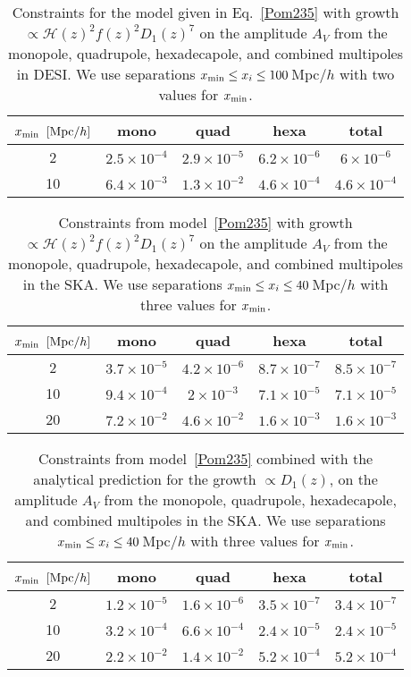 \documentclass[a4paper,twocolumn,aps,prd,nolongbibliography,superscriptaddress,showpacs,showkeys,amsmath,amssymb,floatfix,nofootinbib]{revtex4-1}
\renewcommand{\[}{\begin{equation}}
\renewcommand{\]}{\end{equation}}
\newcommand{\Hcal}{\mathcal{H}}
\begin{document}
\begin{table}[t]
\centering
\begin{tabular}{ | c | c  | c | c | c | }
\hline
$x_{\rm min}$ $[{\rm Mpc}/h]$ & mono & quad & hexa & total \\ \hline
2  & $2.5\times 10^{-4}$ & $2.9\times 10^{-5}$ & $6.2\times 10^{-6}$ & $6\times 10^{-6}$ \\ \hline
10 & $6.4\times 10^{-3}$ & $1.3\times 10^{-2}$ & $4.6\times 10^{-4}$ & $4.6\times 10^{-4}$ \\ \hline
\end{tabular}
\caption{Constraints for the model given in Eq.~\eqref{Pom235} with growth $\propto \Hcal(z)^2f(z)^2D_1(z)^7$ on the amplitude $A_V$ from the monopole, quadrupole, hexadecapole, and combined multipoles in DESI. We use separations $x_{\rm min}\leq x_i\leq 100$\,Mpc$/h$ with two values for $x_{\rm min}$.}
\label{tab:DESI}
\end{table}

\begin{table}[t]
\centering
\begin{tabular}{ | c | c  | c | c | c | }
\hline
$x_{\rm min}$ $[{\rm Mpc}/h]$ & mono & quad & hexa & total \\ \hline
2  & $3.7\times 10^{-5}$ & $4.2\times 10^{-6}$ & $8.7\times 10^{-7}$ & $8.5\times 10^{-7}$ \\ \hline
10 & $9.4\times 10^{-4}$ & $2\times 10^{-3}$ & $7.1\times 10^{-5}$ & $7.1\times 10^{-5}$ \\ \hline
20 & $7.2\times 10^{-2}$ & $4.6\times 10^{-2}$ & $1.6\times 10^{-3}$ & $1.6\times 10^{-3}$ \\ \hline
\end{tabular}
\caption{Constraints from model~\eqref{Pom235} with growth $\propto \Hcal(z)^2f(z)^2D_1(z)^7$ on the amplitude $A_V$ from the monopole, quadrupole, hexadecapole, and combined multipoles in the SKA. We use separations $x_{\rm min}\leq x_i\leq 40$\,Mpc$/h$ with three values for $x_{\rm min}$.
\label{tab:SKA}}
\end{table}

\begin{table}[t]
\centering
\begin{tabular}{ | c | c  | c | c | c | }
\hline
$x_{\rm min}$ $[{\rm Mpc}/h]$ & mono & quad & hexa & total \\ \hline
2  & $1.2\times 10^{-5}$ & $1.6\times 10^{-6}$ & $3.5\times 10^{-7}$ & $3.4\times 10^{-7}$ \\ \hline
10 & $3.2\times 10^{-4}$ & $6.6\times 10^{-4}$ & $2.4\times 10^{-5}$ & $2.4\times 10^{-5}$ \\ \hline
20 & $2.2\times 10^{-2}$ & $1.4\times 10^{-2}$ & $5.2\times 10^{-4}$ & $5.2\times 10^{-4}$ \\ \hline
\end{tabular}
\caption{Constraints from model~\eqref{Pom235} combined with the analytical prediction for the growth $\propto D_1(z)$, on the amplitude $A_V$ from the monopole, quadrupole, hexadecapole, and combined multipoles in the SKA. We use separations $x_{\rm min}\leq x_i\leq 40$\,Mpc$/h$ with three values for $x_{\rm min}$.
\label{tab:SKAanalytic}}
\end{table}
\end{document}
